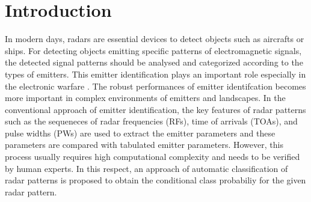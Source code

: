 \documentclass[runningheads,a4paper]{llncs}
\begin{document}
\section{Introduction}

In modern days, radars are essential devices to detect objects such as aircrafts or ships. For detecting objects emitting specific patterns of
electromagnetic signals, the detected signal patterns should be analysed and categorized according to the types of emitters. 
This emitter identification plays an important role especially in the electronic warfare \cite{sch86}. The robust performances of
emitter identifcation becomes more important in complex environments of emitters and landscapes. In the conventional
approach of emitter identification, the key features of radar patterns such as the sequeneces of radar frequencies (RFs), 
time of arrivals (TOAs), and pulse widths (PWs) are used
to extract the emitter parameters and these parameters are compared with tabulated emitter parameters. However, this process usually requires high
computational complexity and needs to be verified by human experts. In this respect, an approach of automatic classification of
radar patterns is proposed to obtain the conditional class probabiliy for the given radar pattern.
\end{document}

